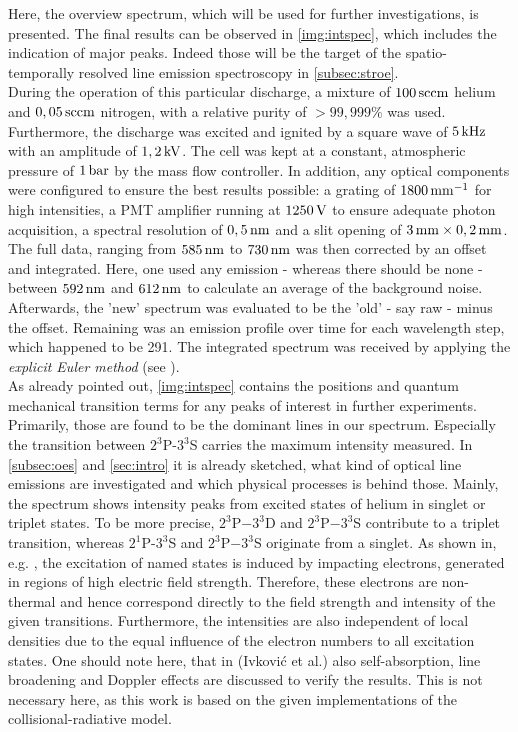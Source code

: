 \documentclass[a4paper,10pt,twoside]{article}
\newcommand{\tilt}[1]{\textit{#1}}
\begin{document}
			Here, the overview spectrum, which will be used for further investigations, is presented. The final results can be observed in \autoref{img:intspec}, which includes the indication of major peaks. Indeed those will be the target of the spatio-temporally resolved line emission spectroscopy in \autoref{subsec:stroe}.\\
			During the operation of this particular discharge, a mixture of $\unit[100]{sccm}$ helium and $\unit[0,05]{sccm}$ nitrogen, with a relative purity of $>99,999\%$ was used. Furthermore, the discharge was excited and ignited by a square wave of $\unit[5]{kHz}$ with an amplitude of $\unit[1,2]{kV}$. The cell was kept at a constant, atmospheric pressure of $\unit[1]{bar}$ by the mass flow controller. In addition, any optical components were configured to ensure the best results possible: a grating of $\unit[1800]{mm^{-1}}$ for high intensities, a PMT amplifier running at $\unit[1250]{V}$ to ensure adequate photon acquisition, a spectral resolution of $\unit[0,5]{nm}$ and a slit opening of $\unit[3]{mm}\times\unit[0,2]{mm}$.\\
			The full data, ranging from $\unit[585]{nm}$ to $\unit[730]{nm}$ was then corrected by an offset and integrated. Here, one used any emission - whereas there should be none - between $\unit[592]{nm}$ and $\unit[612]{nm}$ to calculate an average of the background noise. Afterwards, the 'new' spectrum was evaluated to be the 'old' - say raw - minus the offset. Remaining was an emission profile over time for each wavelength step, which happened to be 291. The integrated spectrum was received by applying the \tilt{explicit Euler method} (see \cite{Wiki:Euler}).\\
			As already pointed out, \autoref{img:intspec} contains the positions and quantum mechanical transition terms for any peaks of interest in further experiments. Primarily, those are found to be the dominant lines in our spectrum. Especially the transition between $2^3$P-$3^3$S carries the maximum intensity measured. In \autoref{subsec:oes} and \autoref{sec:intro} it is already sketched, what kind of optical line emissions are investigated and which physical processes is behind those. Mainly, the spectrum shows intensity peaks from excited states of helium in singlet or triplet states. To be more precise, $2^3$P$-3^3$D and $2^3$P$-3^3$S contribute to a triplet transition, whereas $2^1$P-$3^3$S and $2^3$P$-3^3$S originate from a singlet. As shown in, e.g. \cite{linratio1_14}, the excitation of named states is induced by impacting electrons, generated in regions of high electric field strength. Therefore, these electrons are non-thermal and hence correspond directly to the field strength and intensity of the given transitions. Furthermore, the intensities are also independent of local densities due to the equal influence of the electron numbers to all excitation states. One should note here, that in \cite{linratio1_14} (Ivkovi{\'c} et al.) also self-absorption, line broadening and Doppler effects are discussed to verify the results. This is not necessary here, as this work is based on the given implementations of the collisional-radiative model.
			
\end{document}
